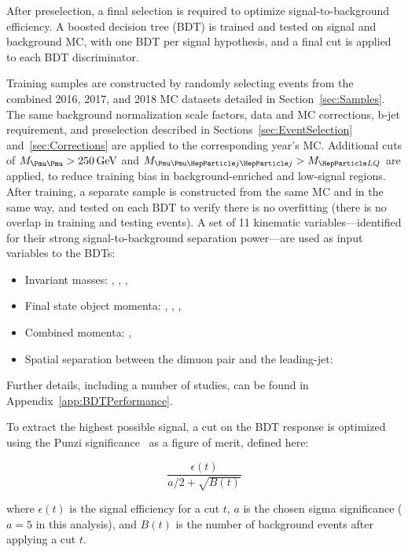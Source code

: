 
After preselection, a final selection is required to optimize signal-to-background efficiency. A boosted decision tree (BDT) is trained and tested on signal and background MC, with one BDT per signal hypothesis, and a final cut is applied to each BDT discriminator. 

Training samples are constructed by randomly selecting events from the combined 2016, 2017, and 2018 MC datasets detailed in Section~\ref{sec:Samples}. The same background normalization scale factors, data and MC corrections, b-jet requirement, and preselection described in Sections~\ref{sec:EventSelection} and~\ref{sec:Corrections} are applied to the corresponding year's MC. Additional cuts of $\Muu > \SI{250}{\GeV}$ and $\Muujj > \MLQ$ are applied, to reduce training bias in background-enriched and low-signal regions. After training, a separate sample is constructed from the same MC and in the same way, and tested on each BDT to verify there is no overfitting (there is no overlap in training and testing events). A set of 11 kinematic variables---identified for their strong signal-to-background separation power---are used as input variables to the BDTs: 
\begin{itemize}
    \item Invariant masses: \Muu, \Muujj, \MujOne, \MujTwo
    \item Final state object momenta: \ptof{\PmuOne}, \ptof{\PmuTwo}, \ptof{\PjOne}, \ptof{\PjTwo}
    \item Combined momenta: \ST, \MET
    \item Spatial separation between the dimuon pair and the leading-\pt jet: \DRof{\PmuOne+\PmuTwo}{\PjOne}
\end{itemize}
Further details, including a number of studies, can be found in Appendix~\ref{app:BDTPerformance}.

To extract the highest possible signal, a cut on the BDT response is optimized using the Punzi significance~\cite{Punzi} as a figure of merit, defined here:

\begin{equation}
    \frac{\epsilon(t)}{a/2+\sqrt{B(t)}}
    \label{eq:punzi}
\end{equation}

where $\epsilon(t)$ is the signal efficiency for a cut $t$, $a$ is the chosen sigma significance ($a = 5$ in this analysis), and $B(t)$ is the number of background events after applying a cut $t$.

